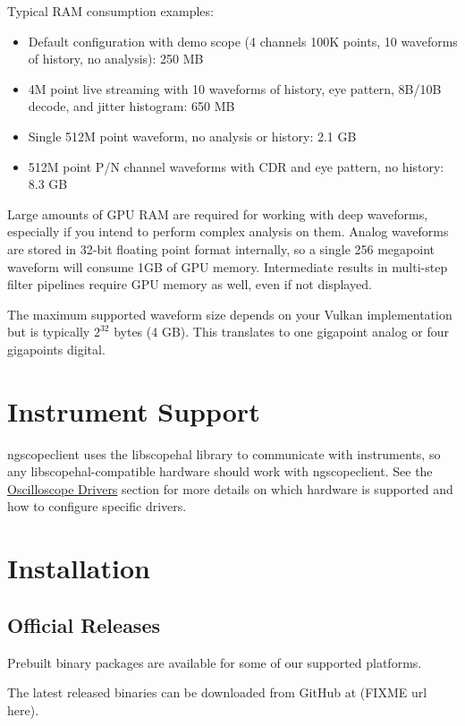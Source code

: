 Typical RAM consumption examples:
\begin{itemize}
\item Default configuration with demo scope (4 channels 100K points, 10 waveforms of history, no analysis): 250 MB
\item 4M point live streaming with 10 waveforms of history, eye pattern, 8B/10B decode, and jitter histogram: 650 MB
\item Single 512M point waveform, no analysis or history: 2.1 GB
\item 512M point P/N channel waveforms with CDR and eye pattern, no history: 8.3 GB
\end{itemize}

Large amounts of GPU RAM are required for working with deep waveforms, especially if you intend to perform
complex analysis on them. Analog waveforms are stored in 32-bit floating point format internally, so a single 256
megapoint waveform will consume 1GB of GPU memory. Intermediate results in multi-step filter pipelines require GPU
memory as well, even if not displayed.

The maximum supported waveform size depends on your Vulkan implementation but is typically $2^32$ bytes (4 GB). This
translates to one gigapoint analog or four gigapoints digital.

\section{Instrument Support}

ngscopeclient uses the libscopehal library to communicate with instruments, so any libscopehal-compatible hardware
should work with ngscopeclient. See the \hyperref[sec:scope-drivers]{Oscilloscope Drivers} section for more details on
which hardware is supported and how to configure specific drivers.

\section{Installation}

\subsection{Official Releases}

Prebuilt binary packages are available for some of our supported platforms.

The latest released binaries can be downloaded from GitHub at (FIXME url here).

